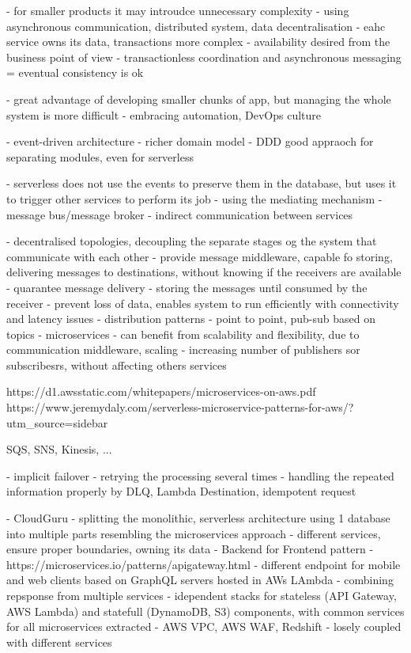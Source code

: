 - for smaller products it may introudce unnecessary complexity
- using asynchronous communication, distributed system, data decentralisation - eahc service owns its data, transactions more complex
- availability desired from the business point of view - transactionless coordination and asynchronous messaging = eventual consistency is ok

- great advantage of developing smaller chunks of app, but managing the whole system is more difficult - embracing automation, DevOps culture

\label{chapter:event-driven-architecture}
- event-driven architecture - richer domain model - DDD good appraoch for separating modules, even for serverless

\label{chapter:event-driven-sourcing}
- serverless does not use the events to preserve them in the database, but uses it to trigger other services to perform its job
- using the mediating mechanism - message bus/message broker - indirect communication between services

\label{chapter:message-brokers}
- decentralised topologies, decoupling the separate stages og the system that communicate with each other
- provide message middleware, capable fo storing, delivering messages to destinations, without knowing if the receivers are available
- quarantee message delivery - storing the messages until consumed by the receiver - prevent loss of data, enables system to run efficiently with connectivity and latency issues
- distribution patterns - point to point, pub-sub based on topics
- microservices - can benefit from scalability and flexibility, due to communication middleware, scaling - increasing number of publishers sor subscribesrs, without affecting others services

https://d1.awsstatic.com/whitepapers/microservices-on-aws.pdf
https://www.jeremydaly.com/serverless-microservice-patterns-for-aws/?utm_source=sidebar

SQS, SNS, Kinesis, ...

\label{chapter:serverless-suitability-operation-types}
- implicit failover - retrying the processing several times - handling the repeated information properly by DLQ, Lambda Destination, idempotent request

\label{chapter:serverless-suitability-cloudguru}
- CloudGuru - splitting the monolithic, serverless architecture using 1 database into multiple parts resembling the microservices approach - different services, ensure proper boundaries, owning its data
- Backend for Frontend pattern - https://microservices.io/patterns/apigateway.html - different endpoint for mobile and web clients based on GraphQL servers hosted in AWs LAmbda - combining repsponse from multiple services
- idependent stacks for stateless (API Gateway, AWS Lambda) and statefull (DynamoDB, S3) components, with common services for all microservices extracted - AWS VPC, AWS WAF, Redshift - losely coupled with different services

